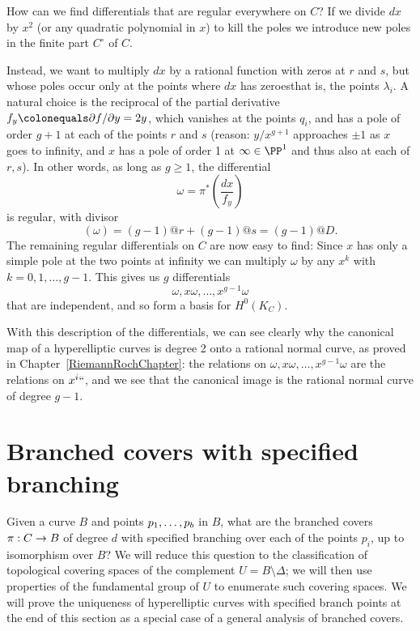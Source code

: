 How can we find differentials that are regular everywhere on $C$? If we
divide $dx$ by $x^2$ (or any quadratic polynomial in $x$) to kill the
poles we  introduce new poles in the finite part $C^\circ$ of $C$.

Instead, we want to multiply $dx$ by a rational function with zeros
at $r$ and $s$, but whose poles occur only at the points where $dx$
has zeroes\emdash that is, the points $\lambda_i$.  A natural choice is the
reciprocal of the partial derivative $f_y \colonequals  \partial f/ \partial y =
2y$, which vanishes at the points $q_i$, and has  a pole of order $g+1$
at each of the points $r$ and $s$ (reason: $y/x^{g+1}$ approaches $\pm
1$ as $x$ goes to infinity, and $x$ has a pole of order 1 at $\infty\in
\PP^{1}$ and thus also at each of $r,s$). In other words, as long as $g
\geq 1$, the differential
$$
\omega = \pi^*\left(\frac{dx}{f_y}\right)
$$
is regular, with divisor
$$
(\omega) = (g-1)@r + (g-1)@s = (g-1)@D.
$$
The remaining regular differentials on $C$ are now easy to find: Since
$x$ has only a simple pole
at the two points at infinity we can  multiply $\omega$ by any $x^k$ with
$k = 0, 1, \dots, g-1$.
This gives us $g$ differentials
$$
\omega, x\omega, \dots, x^{g-1}\omega
$$
that are independent, and so form a basis for $H^0(K_C)$.

With this description of the differentials, we can see clearly why the
canonical map of a hyperelliptic curves is degree 2 onto a rational
normal curve, as proved in Chapter~\ref{RiemannRochChapter}:
the relations on
$
\omega, x\omega, \dots, x^{g-1}\omega
$
are the relations on $x^i` `$, and we see that the canonical image is the
rational normal curve
%
 of degree $g-1$.

\section{Branched covers with specified branching}
\label{branched covers}

Given a curve $B$ and points
$\thinmuskip=3mu plus 2mu p_1,\dots,p_b$ in $B$,
what are the branched covers $\pi :\nobreak C \to\nobreak B$
of degree $d$ with specified branching over each of the points $p_i$,
up to isomorphism over $B$?
We will reduce this question to the classification of topological
covering spaces of the complement $U = B \setminus \Delta$; we will
then use properties of the fundamental group of $U$ to enumerate such
covering spaces. We will prove the uniqueness of hyperelliptic curves with specified branch points
at the end of this section as a special case of a general analysis of branched covers.

